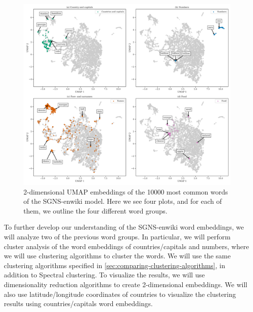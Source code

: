 \begin{figure}[H]
    \centering
    \includegraphics[width=\textwidth]{thesis/figures/word-cluster-all-groups-emphasis-plots.pdf}
    \caption{2-dimensional UMAP embeddings of the 10000 most common words of the SGNS-enwiki model. Here we see four plots, and for each of them, we outline the four different word groups.}
    \label{fig:word-cluster-all-groups-emphasis-plots}
\end{figure}

To further develop our understanding of the SGNS-enwiki word embeddings, we will analyze two of the previous word groups. In particular, we will perform cluster analysis of the word embeddings of countries/capitals and numbers, where we will use clustering algorithms to cluster the words. We will use the same clustering algorithms specified in \cref{sec:comparing-clustering-algorithms}, in addition to Spectral clustering. To visualize the results, we will use dimensionality reduction algorithms to create 2-dimensional embeddings. We will also use latitude/longitude coordinates of countries to visualize the clustering results using countries/capitals word embeddings.

